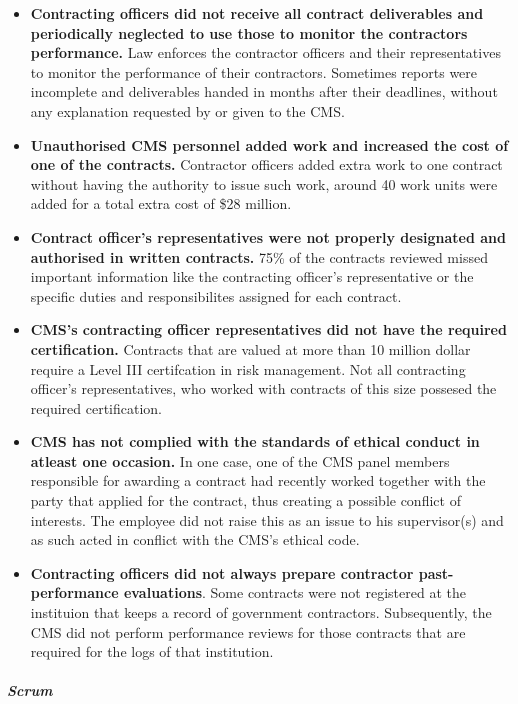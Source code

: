 \documentclass[]{article}
\let\oldsubparagraph\subparagraph
\renewcommand{\subparagraph}[1]{\oldsubparagraph{#1}\mbox{}}
\begin{document}
\begin{itemize}
\item
  \textbf{Contracting officers did not receive all contract deliverables
  and periodically neglected to use those to monitor the contractors
  performance.} Law enforces the contractor officers and their
  representatives to monitor the performance of their contractors.
  Sometimes reports were incomplete and deliverables handed in months
  after their deadlines, without any explanation requested by or given
  to the CMS.
\item
  \textbf{Unauthorised CMS personnel added work and increased the cost
  of one of the contracts.} Contractor officers added extra work to one
  contract without having the authority to issue such work, around 40
  work units were added for a total extra cost of \$28 million.
\item
  \textbf{Contract officer's representatives were not properly
  designated and authorised in written contracts.} 75\% of the contracts
  reviewed missed important information like the contracting officer's
  representative or the specific duties and responsibilites assigned for
  each contract.
\item
  \textbf{CMS's contracting officer representatives did not have the
  required certification.} Contracts that are valued at more than 10
  million dollar require a Level III certifcation in risk management.
  Not all contracting officer's representatives, who worked with
  contracts of this size possesed the required certification.
\item
  \textbf{CMS has not complied with the standards of ethical conduct in
  atleast one occasion.} In one case, one of the CMS panel members
  responsible for awarding a contract had recently worked together with
  the party that applied for the contract, thus creating a possible
  conflict of interests. The employee did not raise this as an issue to
  his supervisor(s) and as such acted in conflict with the CMS's ethical
  code.
\item
  \textbf{Contracting officers did not always prepare contractor
  past-performance evaluations}. Some contracts were not registered at
  the instituion that keeps a record of government contractors.
  Subsequently, the CMS did not perform performance reviews for those
  contracts that are required for the logs of that institution.
\end{itemize}

\subparagraph{Scrum}\label{scrum}
\end{document}
